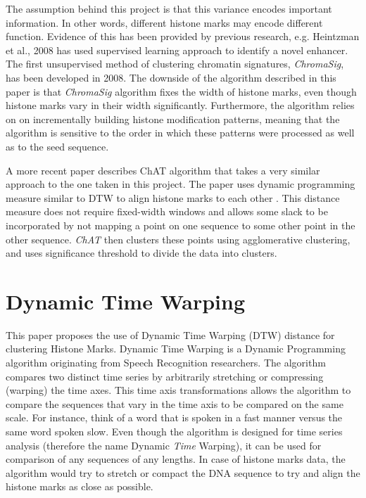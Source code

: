 \documentclass[12pt,a4paper]{article}
\begin{document}
The assumption behind this project is that this variance encodes important
information. In other words, different histone marks may encode different
function. Evidence of this has been provided by previous research, e.g.
Heintzman et al., 2008 has used supervised learning approach to identify a
novel enhancer\cite{Heintzman:2007kea}. The first unsupervised method of
clustering chromatin signatures, \emph{ChromaSig}, has been developed in
2008\cite{Hon:2008wv}.  The downside of the algorithm described in this paper
is that \emph{ChromaSig} algorithm fixes the width of histone marks, even
though histone marks vary in their width significantly.  Furthermore, the
algorithm relies on on incrementally building histone modification patterns,
meaning that the algorithm is sensitive to the order in which these patterns
were processed as well as to the seed sequence.

A more recent paper describes
ChAT algorithm that takes a very similar approach to the one taken in this
project.  The paper uses dynamic programming measure similar to DTW to align
histone marks to each other \cite{Wang:2012cb}. This distance measure does not
require fixed-width windows and allows some slack to be incorporated by not
mapping a point on one sequence to some other point in the other sequence.
\emph{ChAT} then clusters these points using agglomerative clustering, and uses
significance threshold to divide the data into clusters. 

\section{Dynamic Time Warping}

This paper proposes the use of Dynamic Time Warping (DTW) distance for
clustering Histone Marks. Dynamic Time Warping is a Dynamic Programming
algorithm originating from Speech Recognition researchers. The algorithm
compares two distinct time series by arbitrarily stretching or compressing
(warping) the time axes. This time axis transformations allows the algorithm to
compare the sequences that vary in the time axis to be compared on the same
scale. For instance, think of a word that is spoken in a fast manner versus the
same word spoken slow. Even though the algorithm is designed for time series
analysis (therefore the name Dynamic \emph{Time} Warping), it can be used for
comparison of any sequences of any lengths. In case of histone marks data, the
algorithm would try to stretch or compact the DNA sequence to try and align the
histone marks as close as possible. 
\end{document}
